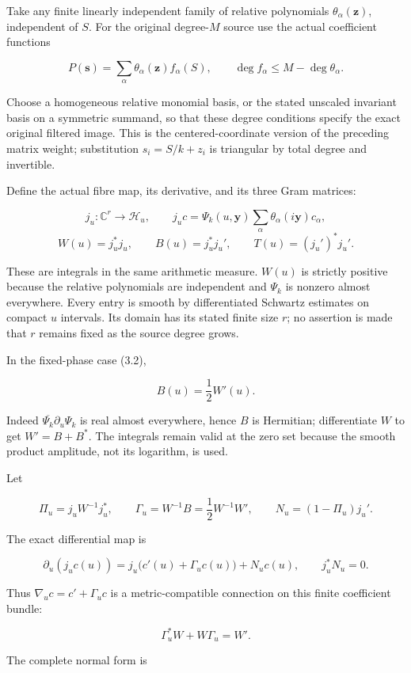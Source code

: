 Take any finite linearly independent family of relative polynomials
\(\theta_\alpha(\mathbf z)\), independent of \(S\). For the original
degree-\(M\) source use the actual coefficient functions

\[P(\mathbf s)=\sum_\alpha\theta_\alpha(\mathbf z)f_\alpha(S),\qquad
\deg f_\alpha\le M-\deg\theta_\alpha.\tag{4.1}\]

Choose a homogeneous relative monomial basis, or the stated unscaled
invariant basis on a symmetric summand, so that these degree conditions
specify the exact original filtered image. This is the
centered-coordinate version of the preceding matrix weight; substitution
\(s_i=S/k+z_i\) is triangular by total degree and invertible.

Define the actual fibre map, its derivative, and its three Gram
matrices:

\[j_u:\mathbb C^r\to\mathscr H_u,\qquad j_uc=\Psi_k(u,\mathbf y)\sum_\alpha\theta_\alpha(i\mathbf y)c_\alpha,\]
\[W(u)=j_u^*j_u,\qquad B(u)=j_u^*j_u',\qquad T(u)=(j_u')^*j_u'.\tag{4.2}\]

These are integrals in the same arithmetic measure. \(W(u)\) is strictly
positive because the relative polynomials are independent and \(\Psi_k\)
is nonzero almost everywhere. Every entry is smooth by differentiated
Schwartz estimates on compact \(u\) intervals. Its domain has its stated
finite size \(r\); no assertion is made that \(r\) remains fixed as the
source degree grows.

In the fixed-phase case (3.2),

\[B(u)=\frac12W'(u).\tag{4.3}\]

Indeed \(\overline{\Psi_k}\partial_u\Psi_k\) is real almost everywhere,
hence \(B\) is Hermitian; differentiate \(W\) to get \(W'=B+B^*\). The
integrals remain valid at the zero set because the smooth product
amplitude, not its logarithm, is used.

Let

\[\Pi_u=j_uW^{-1}j_u^*,\qquad
\Gamma_u=W^{-1}B=\frac12W^{-1}W',\qquad
N_u=(1-\Pi_u)j_u'.\tag{4.4}\]

The exact differential map is

\[\boxed{\partial_u(j_uc(u))=j_u\bigl(c'(u)+\Gamma_uc(u)\bigr)+N_uc(u),\qquad j_u^*N_u=0.}\tag{4.5}\]

Thus \(\nabla_uc=c'+\Gamma_uc\) is a metric-compatible connection on
this finite coefficient bundle:

\[\Gamma_u^*W+W\Gamma_u=W'.\tag{4.6}\]

The complete normal form is

